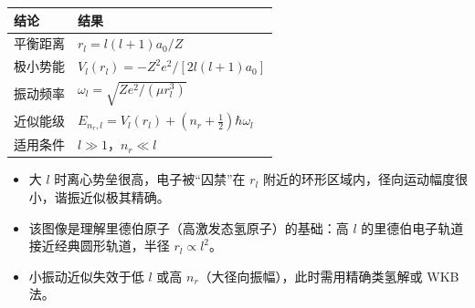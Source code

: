 \begin{formulabox}[答案汇总]
\begin{center}
\begin{tabular}{ll}
\toprule
\textbf{结论} & \textbf{结果} \\
\midrule
平衡距离 & $r_l=l(l+1)a_0/Z$ \\
极小势能 & $V_l(r_l)=-Z^2e^2/[2l(l+1)a_0]$ \\
振动频率 & $\omega_l=\sqrt{Ze^2/(\mu r_l^3)}$ \\
近似能级 & $E_{n_r,l}=V_l(r_l)+(n_r+\frac12)\hbar\omega_l$ \\
适用条件 & $l\gg1$，$n_r\ll l$ \\
\bottomrule
\end{tabular}
\end{center}
\end{formulabox}

\begin{insightbox}[物理图像]
\begin{itemize}
    \item 大 $l$ 时离心势垒很高，电子被``囚禁''在 $r_l$ 附近的环形区域内，径向运动幅度很小，谐振近似极其精确。
    \item 该图像是理解里德伯原子（高激发态氢原子）的基础：高 $l$ 的里德伯电子轨道接近经典圆形轨道，半径 $r_l\propto l^2$。
    \item 小振动近似失效于低 $l$ 或高 $n_r$（大径向振幅），此时需用精确类氢解或 WKB 法。
\end{itemize}
\end{insightbox}
